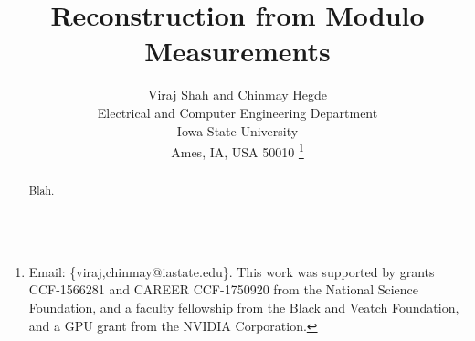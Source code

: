 \documentclass[10pt,journal]{IEEEtran}
\begin{document}
\title{Reconstruction from Modulo Measurements}

\author{
	Viraj Shah and Chinmay Hegde \\
	Electrical and Computer Engineering Department \\
	Iowa State University \\
	Ames, IA, USA 50010
	\thanks{Email: \{viraj,chinmay@iastate.edu\}. This work was supported by grants CCF-1566281 and CAREER CCF-1750920 from the National Science Foundation, and a faculty fellowship from the Black and Veatch Foundation, and a GPU grant from the NVIDIA Corporation.
	}
}

\maketitle
\begin{abstract}
Blah.
\end{abstract}







%
%
%


%
%
\end{document}
